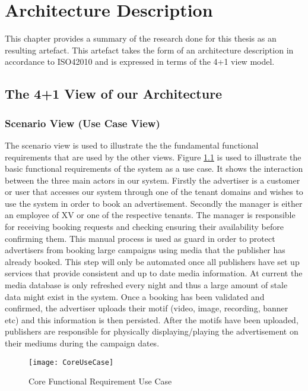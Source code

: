 \chapter{Architecture Description}
\label{chap:ad}
This chapter provides a summary of the research done for this thesis as an resulting artefact. This artefact takes the form of an architecture description in accordance to ISO42010 and is expressed in terms of the 4+1 view model.

\section{The 4+1 View of our Architecture}

\subsection{Scenario View (Use Case View)}
The scenario view is used to illustrate the the fundamental functional requirements that are used by the other views. Figure \ref{fig:coreusecase} is used to illustrate the basic functional requirements of the system as a use case. It shows the interaction between the three main actors in our system. Firstly the advertiser is a customer or user that accesses our system through one of the tenant domains and wishes to use the system in order to book an advertisement. Secondly the manager is either an employee of XV or one of the respective tenants. The manager is responsible for receiving booking requests and checking ensuring their availability  before confirming them. This manual process is used as guard in order to protect advertisers from booking large campaigns using media that the publisher has already booked. This step will only be automated once all publishers have set up services that provide consistent and up to date media information. At current the media database is only refreshed every night and thus a large amount of stale data might exist in the system. Once a booking has been validated and confirmed, the advertiser uploads their motif (video, image, recording, banner etc) and this information is then persisted. After the motifs have been uploaded, publishers are responsible for physically displaying/playing the advertisement on their mediums during the campaign dates.


\begin{figure}
\centering
\texttt{[image: CoreUseCase]}
\caption{Core Functional Requirement Use Case}
\label{fig:coreusecase}
\end{figure}

